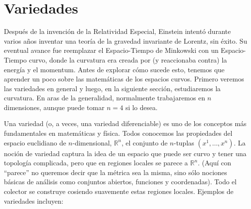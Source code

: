 \documentclass[11pt,b5paper,openany,twoside]{book}
\begin{document}
\chapter{Variedades}


Después de la invención de la Relatividad Especial, Einstein intentó durante varios años inventar una teoría de la gravedad invariante de Lorentz, sin éxito.
Su eventual avance fue reemplazar el Espacio-Tiempo de Minkowski con un Espacio-Tiempo curvo, donde la curvatura era creada por (y reaccionaba contra) la energía y el momentum.
Antes de explorar cómo sucede esto, tenemos que aprender un poco sobre las matemáticas de los espacios curvos.
Primero veremos las variedades en general y luego, en la siguiente sección, estudiaremos la curvatura.
En aras de la generalidad, normalmente trabajaremos en $n$ dimensiones, aunque puede tomar $n=4$ si lo desea.

Una variedad (o, a veces, una variedad diferenciable) es uno de los conceptos más fundamentales en matemáticas y física.
Todos conocemos las propiedades del espacio euclidiano de $n$-dimensional, $\mathbb{R}^n$, el conjunto de $n$-tuplas $(x^1,\ldots,x^n)$.
La noción de variedad captura la idea de un espacio que puede ser curvo y tener una topología complicada, pero que en regiones locales se parece a $\mathbb{R}^n$.
(Aquí con ``parece'' no queremos decir que la métrica sea la misma, sino sólo nociones básicas de análisis como conjuntos abiertos, funciones y coordenadas).
Todo el colector se construye cosiendo suavemente estas regiones locales.
Ejemplos de variedades incluyen:
\end{document}
